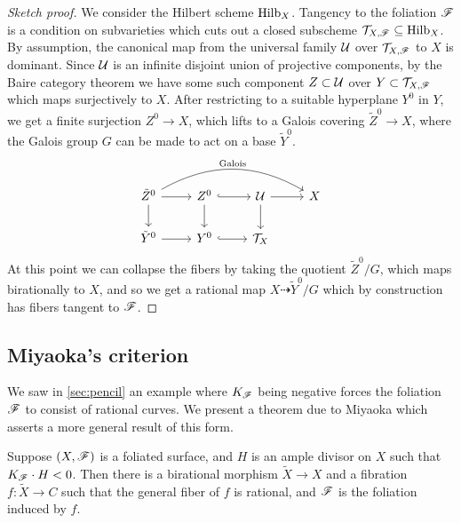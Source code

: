 \begin{proof}[Sketch proof]
    We consider the Hilbert scheme $\operatorname{Hilb}_X$. Tangency to the foliation $\mathscr{F}$
    is a condition on subvarieties which cuts out a closed subscheme
    $\mathcal{T}_{X,\mathscr{F}}\subseteq\operatorname{Hilb}_X$. By assumption, the canonical map from the
    universal family $\mathcal{U}$ over $\mathcal{T}_{X,\mathscr{F}}$ to $X$ is dominant. Since
    $\mathcal{U}$ is an infinite disjoint union of projective components, by the Baire
    category theorem we have some such component $Z\subset\mathcal{U}$ over
    $Y\subset\mathcal{T}_{X,\mathscr{F}}$ which maps surjectively to $X$. After restricting
    to a suitable hyperplane $Y^0$ in $Y$, we get a finite surjection
    $Z^0\to X$, which lifts to a Galois covering $\tilde Z^0\to X$, where the
    Galois group $G$ can be made to act on a base $\tilde Y^0$.
    \begin{equation*}
        \begin{tikzcd}
            \tilde Z^0 \ar[d] \ar[r]
                \ar[rrr,bend left,"\text{Galois}"] &
            Z^0 \ar[d] \ar[r,hook] &
            \calU \ar[d] \ar[r] & X \\
            \tilde Y^0 \ar[r] & Y^0 \ar[r,hook] & \calT_X
        \end{tikzcd}
    \end{equation*}
    At this point we can collapse the fibers by taking the quotient
    $\tilde Z^0/G$, which maps birationally to $X$, and so we get a rational map
    $X\dashrightarrow \tilde Y^0/G$ which by construction has fibers tangent to
    $\mathscr{F}$.
\end{proof}


\subsection{Miyaoka's criterion}

We saw in \cref{sec:pencil} an example where $K_{\mathscr{F}}$ being negative forces the
foliation $\mathscr{F}$ to consist of rational curves. We present a theorem due to
Miyaoka which asserts a more general result of this form.

\begin{theorem}[Miyaoka]
    Suppose $(X,\mathscr{F})$ is a foliated surface, and $H$ is an ample divisor on
    $X$ such that $K_{\mathscr{F}}\cdot H<0$. Then there is a birational morphism
    $\tilde X\to X$ and a fibration $f:\tilde X\to C$ such that the general
    fiber of $f$ is rational, and $\mathscr{F}$ is the foliation induced by $f$.
\end{theorem}

